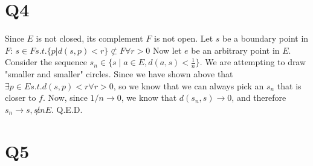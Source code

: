 \documentclass[12pt]{article}
\begin{document}
\section{Q4}
Since $E$ is not closed, its complement $F$ is not open. Let $s$ be a boundary point in $F$: $s \in F s.t. \{p|d(s,p)<r \} \not\subset F \forall r > 0$
\newline
Now let $e$ be an arbitrary point in $E$. Consider the sequence $s_n \in \{s \mid a\in E, d(a,s)<\frac{1}{n}\}$. We are attempting to draw "smaller and smaller" circles. Since we have shown above that $\exists p \in E s.t. d(s,p)<r \forall r>0$, so we know that we can always pick an $s_n$ that is closer to $f$. Now, since $1/n \to 0$, we know that $d(s_n, s)\to 0$, and therefore $s_n \to s, s \not in E$. Q.E.D.


\section{Q5}
\end{document}

